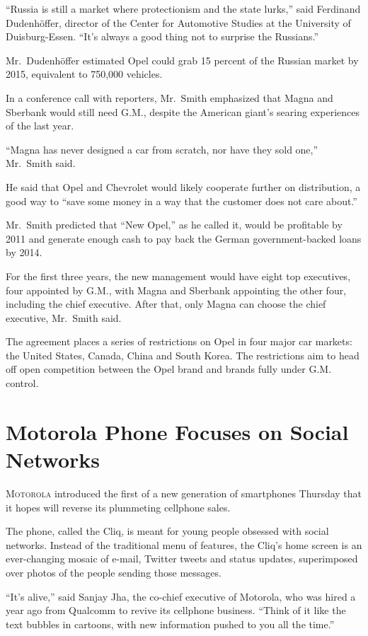 ﻿\documentclass[12pt]{article}
\begin{document}
``Russia is still a market where protectionism and the state lurks,'' said Ferdinand Dudenhöffer,
director of the Center for Automotive Studies at the University of Duisburg-Essen. ``It's always a
good thing not to surprise the Russians.''

Mr.~Dudenhöffer estimated Opel could grab 15 percent of the Russian market by 2015, equivalent to
750,000 vehicles.

In a conference call with reporters, Mr.~Smith emphasized that Magna and Sberbank would still need
G.M., despite the American giant's searing experiences of the last year.

``Magna has never designed a car from scratch, nor have they sold one,'' Mr.~Smith said.

He said that Opel and Chevrolet would likely cooperate further on distribution, a good way to ``save
some money in a way that the customer does not care about.''

Mr.~Smith predicted that ``New Opel,'' as he called it, would be profitable by 2011 and generate
enough cash to pay back the German government-backed loans by 2014.

For the first three years, the new management would have eight top executives, four appointed by
G.M., with Magna and Sberbank appointing the other four, including the chief executive. After that,
only Magna can choose the chief executive, Mr.~Smith said.

The agreement places a series of restrictions on Opel in four major car markets: the United States,
Canada, China and South Korea. The restrictions aim to head off open competition between the Opel
brand and brands fully under G.M. control.

\section{Motorola Phone Focuses on Social Networks}

\lettrine{M}{otorola} introduced the first of a new generation of smartphones Thursday that it hopes
will reverse its plummeting cellphone sales.

The phone, called the Cliq, is meant for young people obsessed with social networks. Instead of the
traditional menu of features, the Cliq's home screen is an ever-changing mosaic of e-mail, Twitter
tweets and status updates, superimposed over photos of the people sending those messages.

``It's alive,'' said Sanjay Jha, the co-chief executive of Motorola, who was hired a year ago from
Qualcomm to revive its cellphone business. ``Think of it like the text bubbles in cartoons, with new
information pushed to you all the time.''
\end{document}
